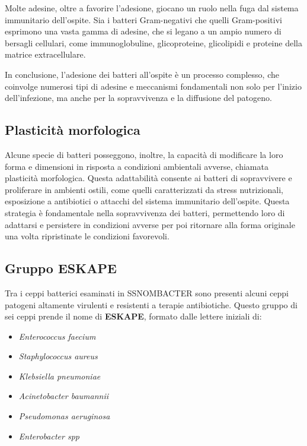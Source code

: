 \documentclass[../main.tex]{subfiles}
\begin{document}
Molte adesine, oltre a favorire l'adesione, giocano un ruolo nella fuga dal sistema immunitario dell'ospite. Sia i batteri Gram-negativi che quelli Gram-positivi esprimono una vasta gamma di adesine, che si legano a un ampio numero di bersagli cellulari, come immunoglobuline, glicoproteine, glicolipidi e proteine della matrice extracellulare.\cite{finlay_1997}

In conclusione, l'adesione dei batteri all'ospite è un processo complesso, che coinvolge numerosi tipi di adesine e meccanismi fondamentali non solo per l'inizio dell'infezione, ma anche per la sopravvivenza e la diffusione del patogeno.

\subsection{Plasticità morfologica}

Alcune specie di batteri posseggono, inoltre, la capacità di modificare la loro forma e dimensioni in risposta a condizioni ambientali avverse, chiamata plasticità morfologica. Questa adattabilità consente ai batteri di sopravvivere e proliferare in ambienti ostili, come quelli caratterizzati da stress nutrizionali, esposizione a antibiotici o attacchi del sistema immunitario dell'ospite. Questa strategia è fondamentale nella sopravvivenza dei batteri, permettendo loro di adattarsi e persistere in condizioni avverse per poi ritornare alla forma originale una volta ripristinate le condizioni favorevoli.\cite{justice_2008}\bigskip

\subsection{Gruppo ESKAPE}

Tra i ceppi batterici esaminati in SSNOMBACTER sono presenti alcuni ceppi patogeni altamente virulenti e resistenti a terapie antibiotiche. Questo gruppo di sei ceppi prende il nome di \textbf{ESKAPE}, formato dalle lettere iniziali di:

\begin{itemize}
	\itemsep0em
	\item \textit{Enterococcus faecium}
	\item \textit{Staphylococcus aureus}
	\item \textit{Klebsiella pneumoniae}
	\item \textit{Acinetobacter baumannii}
	\item \textit{Pseudomonas aeruginosa}
	\item \textit{Enterobacter spp}
\end{itemize}
\end{document}
